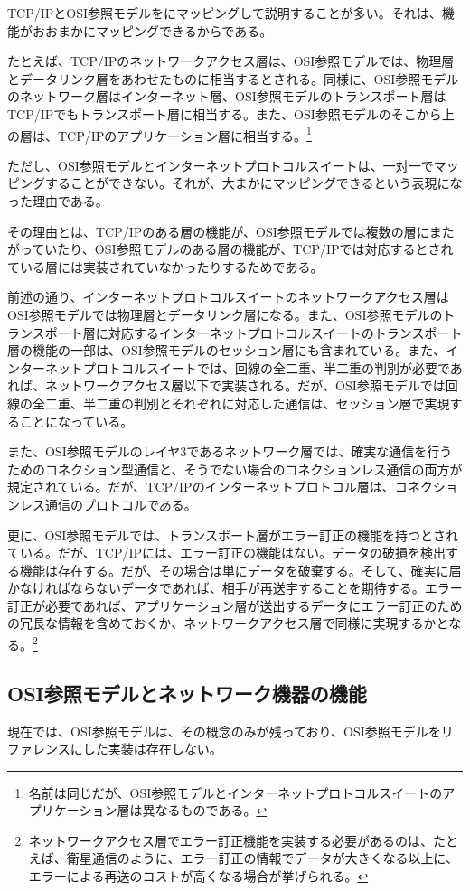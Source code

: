 TCP/IPとOSI参照モデルをにマッピングして説明することが多い。それは、機能がおおまかにマッピングできるからである。

たとえば、TCP/IPのネットワークアクセス層は、OSI参照モデルでは、物理層とデータリンク層をあわせたものに相当するとされる。同様に、OSI参照モデルのネットワーク層はインターネット層、OSI参照モデルのトランスポート層はTCP/IPでもトランスポート層に相当する。また、OSI参照モデルのそこから上の層は、TCP/IPのアプリケーション層に相当する。\footnote{名前は同じだが、OSI参照モデルとインターネットプロトコルスイートのアプリケーション層は異なるものである。}

ただし、OSI参照モデルとインターネットプロトコルスイートは、一対一でマッピングすることができない。それが、大まかにマッピングできるという表現になった理由である。

その理由とは、TCP/IPのある層の機能が、OSI参照モデルでは複数の層にまたがっていたり、OSI参照モデルのある層の機能が、TCP/IPでは対応するとされている層には実装されていなかったりするためである。

前述の通り、インターネットプロトコルスイートのネットワークアクセス層はOSI参照モデルでは物理層とデータリンク層になる。また、OSI参照モデルのトランスポート層に対応するインターネットプロトコルスイートのトランスポート層の機能の一部は、OSI参照モデルのセッション層にも含まれている。また、インターネットプロトコルスイートでは、回線の全二重、半二重の判別が必要であれば、ネットワークアクセス層以下で実装される。だが、OSI参照モデルでは回線の全二重、半二重の判別とそれぞれに対応した通信は、セッション層で実現することになっている。

また、OSI参照モデルのレイヤ3であるネットワーク層では、確実な通信を行うためのコネクション型通信と、そうでない場合のコネクションレス通信の両方が規定されている。だが、TCP/IPのインターネットプロトコル層は、コネクションレス通信のプロトコルである。

更に、OSI参照モデルでは、トランスポート層がエラー訂正の機能を持つとされている。だが、TCP/IPには、エラー訂正の機能はない。データの破損を検出する機能は存在する。だが、その場合は単にデータを破棄する。そして、確実に届かなければならないデータであれば、相手が再送宇することを期待する。エラー訂正が必要であれば、アプリケーション層が送出するデータにエラー訂正のための冗長な情報を含めておくか、ネットワークアクセス層で同様に実現するかとなる。\footnote{ネットワークアクセス層でエラー訂正機能を実装する必要があるのは、たとえば、衛星通信のように、エラー訂正の情報でデータが大きくなる以上に、エラーによる再送のコストが高くなる場合が挙げられる。}


\subsection{OSI参照モデルとネットワーク機器の機能}
現在では、OSI参照モデルは、その概念のみが残っており、OSI参照モデルをリファレンスにした実装は存在しない。

